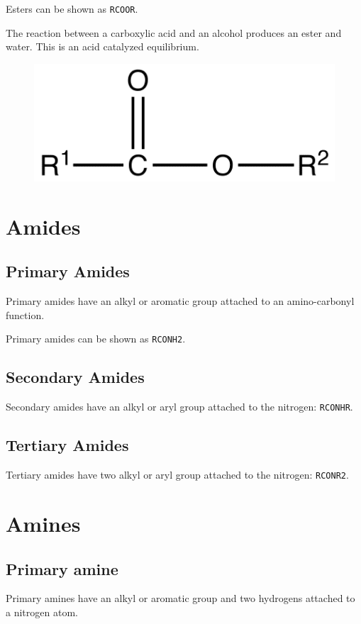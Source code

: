 \documentclass[oneside]{book}
\begin{document}
Esters can be shown as \texttt{RCOOR}.

The reaction between a carboxylic acid and an alcohol produces an ester and
water.
This is an acid catalyzed equilibrium.

\begin{figure}[ht]
\includegraphics{ester.png}
\centering
\end{figure}

\section{Amides}
\subsection{Primary Amides}
Primary amides have an alkyl or aromatic group attached to an amino-carbonyl
function.

Primary amides can be shown as \texttt{RCONH2}.

\subsection{Secondary Amides}
Secondary amides have an alkyl or aryl group attached to the nitrogen:
\texttt{RCONHR}.

\subsection{Tertiary Amides}
Tertiary amides have two alkyl or aryl group attached to the nitrogen:
\texttt{RCONR2}.

\section{Amines}
\subsection{Primary amine}
Primary amines have an alkyl or aromatic group and two hydrogens attached to a
nitrogen atom.
\end{document}
